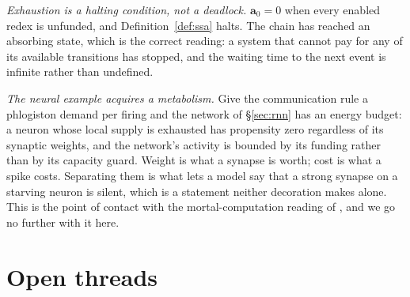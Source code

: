 \documentclass[11pt,a4paper]{article}
\theoremstyle{plain}
\theoremstyle{definition}
\theoremstyle{remark}
\newcommand{\prop}{\mathbf{a}}
\begin{document}
\emph{Exhaustion is a halting condition, not a deadlock.} $\prop_0 = 0$ when every enabled redex is
unfunded, and Definition~\ref{def:ssa} halts. The chain has reached an absorbing state, which is the
correct reading: a system that cannot pay for any of its available transitions has stopped, and the
waiting time to the next event is infinite rather than undefined.

\emph{The neural example acquires a metabolism.} Give the communication rule a phlogiston demand per
firing and the network of \S\ref{sec:rnn} has an energy budget: a neuron whose local supply is
exhausted has propensity zero regardless of its synaptic weights, and the network's activity is
bounded by its funding rather than by its capacity guard. Weight is what a synapse is worth; cost is
what a spike costs. Separating them is what lets a model say that a strong synapse on a starving
neuron is silent, which is a statement neither decoration makes alone. This is the point of contact
with the mortal-computation reading of \cite{scientist}, and we go no further with it here.

\section{Open threads}
\label{sec:open}
\end{document}
